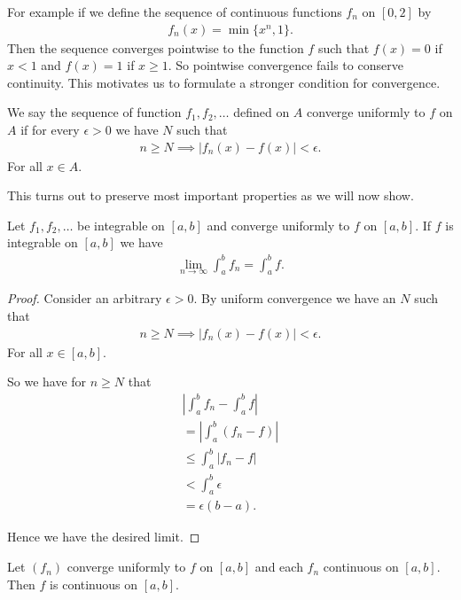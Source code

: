 \documentclass[]{article}
\begin{document}
For example if we define the sequence of continuous functions $f_n$ on $[0,2]$ by
\begin{align*}
		f_n(x) = \min\{x^n, 1\}.
\end{align*}
Then the sequence converges pointwise to the function $f$ such that $f(x) = 0$ if $x < 1$ and $f(x) = 1$ if $x \geq 1$. So pointwise convergence fails to conserve continuity. This motivates us to formulate a stronger condition for convergence.

\begin{defi} 
	  We say the sequence of function $f_1, f_2, \ldots$ defined on $A$ converge uniformly to $f$ on $A$ if for every $\epsilon > 0$ we have $N$ such that
	  \begin{align*}
			  n \geq N \implies |f_n(x) - f(x)| < \epsilon.
	  \end{align*}
	  For all $x \in A$.
\end{defi}

This turns out to preserve most important properties as we will now show.

\begin{thm}
		Let $f_1, f_2, \ldots$ be integrable on $[a,b]$ and converge uniformly to $f$ on $[a,b]$. If $f$ is integrable on $[a,b]$ we have
		\begin{align*}
				\lim_{n \to \infty} \int_a^bf_n = \int_a^bf.
		\end{align*}
\end{thm}

\begin{proof}
		Consider an arbitrary $\epsilon > 0$. By uniform convergence we have an $N$ such that
		\begin{align*}
				n \geq N \implies |f_n(x) - f(x)| < \epsilon.
		\end{align*}
		For all $x \in [a,b]$.
		
		So we have for $n \geq N$ that
		\begin{align*}
				|\int_a^bf_n - \int_a^bf| \\
				= |\int_a^b(f_n-f)| \\
				\leq \int_a^b|f_n-f| \\
				< \int_a^b \epsilon \\
				= \epsilon (b-a).
		\end{align*}

		Hence we have the desired limit.
\end{proof}

\begin{thm}
		Let $(f_n)$ converge uniformly to $f$ on $[a,b]$ and each $f_n$ continuous on $[a,b]$. Then $f$ is continuous on $[a,b]$.
\end{thm}
\end{document}
